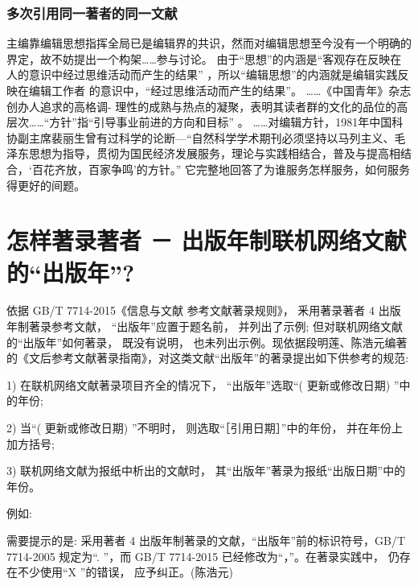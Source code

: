 \documentclass{article}
\begin{document}
\subsubsection{多次引用同一著者的同一文献}
\begin{refsection}
主编靠编辑思想指挥全局已是编辑界的共识\cite{张忠智1997-33-34}，然而对编辑思想至今没有一个明确的界定，故不妨提出一个构架……参与讨论。
由于“思想”的内涵是“客观存在反映在人的意识中经过思维活动而产生的结果”
，所以“编辑思想”的内涵就是编辑实践反映在编辑工作者
的意识中，“经过思维活动而产生的结果”。
……《中国青年》杂志创办人追求的高格调-
理性的成熟与热点的凝聚\cite{刘彻东1998-38-39}，表明其读者群的文化的品位的高层次……“方针”指“引导事业前进的方向和目标”
。
……对编辑方针，1981年中国科协副主席裴丽生曾有过科学的论断—“自然科学学术期刊必须坚持以马列主义、毛泽东思想为指导，贯彻为国民经济发展服务，理论与实践相结合，普及与提高相结合，‘百花齐放，百家争鸣’的方针。” \cite{裴丽生1981-2-10}它完整地回答了为谁服务怎样服务，如何服务得更好的间题。

\printbibliography[heading=subbibliography]
\end{refsection}


\newpage


\section*{怎样著录著者 － 出版年制联机网络文献的“出版年”?}
\begin{refsection}
依据 GB/T 7714-2015《信息与文献 参考文献著录规则》， 釆用著录著者 4 出版年制著录参考文献， “出版年”应置于题名前， 并列出了示例; 但对联机网络文献的“出版年”如何著录， 既没有说明， 也未列出示例。现依据段明莲、陈浩元编著的《文后参考文献著录指南》，对这类文献“出版年”的著录提出如下供参考的规范:

1) 在联机网络文献著录项目齐全的情况下， “出版年”选取“( 更新或修改日期) ”中的年份;

2) 当“( 更新或修改日期) ”不明时， 则选取“［引用日期］”中的年份， 并在年份上加方括号;

3) 联机网络文献为报纸中析出的文献时， 其“出版年”著录为报纸“出版日期”中的年份。

例如:
\nocite{北京市人民政府办公厅2005--,OCLC--,刘裕国2013-01-12--,张田勤2000--,丁文祥2000--,陈建军2010-93-93,杨洪升2013-56-75,刘加林1993--,张凯军2012-04-05--,河北绿洲生态环境科技有限公司2001--}

\printbibliography[heading=none]

需要提示的是: 采用著者 4 出版年制著录的文献，“出版年”前的标识符号，GB/T 7714-2005 规定为“. ”，而 GB/T 7714-2015 已经修改为“，”。在著录实践中， 仍存在不少使用“X ”的错误， 应予纠正。(陈浩元)
\end{refsection}
\end{document}
